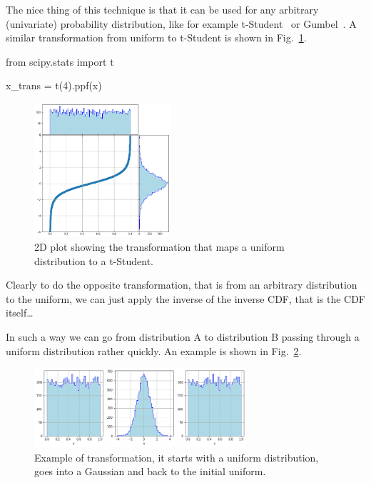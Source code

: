 The nice thing of this technique is that it can be used for any arbitrary (univariate) probability distribution, like for example t-Student~\cite{bib:t_student} or Gumbel~\cite{bib:gumbel}. A similar transformation from uniform to t-Student is shown in Fig.~\ref{fig:uniform_to_tstudent}.

\begin{ipython}
from scipy.stats import t

x_trans = t(4).ppf(x)
\end{ipython}

\begin{figure}[htbp]
  \centering
  \includegraphics[width=0.45\textwidth]{figures/tstudent_to_uniform}
  \caption{2D plot showing the transformation that maps a uniform distribution to a t-Student.}
  \label{fig:uniform_to_tstudent}
\end{figure}

Clearly to do the opposite transformation, that is from an arbitrary distribution to the uniform, we can just apply the inverse of the inverse CDF, that is the CDF itself\ldots

In such a way we can go from distribution A to distribution B passing through a uniform distribution rather quickly. An example is shown in Fig.~\ref{fig:a_to_b_to_a}.

\begin{figure}[htbp]
	\centering
	\includegraphics[width=0.7\textwidth]{figures/a_to_b_to_a}
	\caption{Example of transformation, it starts with a uniform distribution, goes into a Gaussian and back to the initial uniform.}
	\label{fig:a_to_b_to_a}
\end{figure}
\newpage

